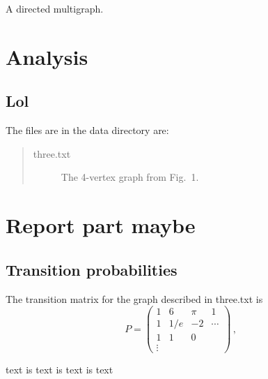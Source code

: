 \documentclass{tufte-handout}
\begin{document}
\newpage
\begin{marginfigure}
\caption{A directed multigraph.}
\end{marginfigure}

\section{Analysis}

\subsection{Lol}

The files are in the data directory are:
\begin{quotation}
\begin{description}
\item[three.txt] The 4-vertex graph from Fig.~1.
\end{description}
\end{quotation}

\section{Report part maybe}

\subsection{Transition probabilities}

The transition matrix for the graph described in three.txt
is
\begin{equation*}
P = 
\left(
\begin{array}{cccc}
1 & 6 & \pi & 1\\
1 & 1/e & -2  & \cdots\\
1 & 1 & 0 \\
\vdots
\end{array}
\right)\,,
\end{equation*}

\noindent text is text is text is text
\end{document}
